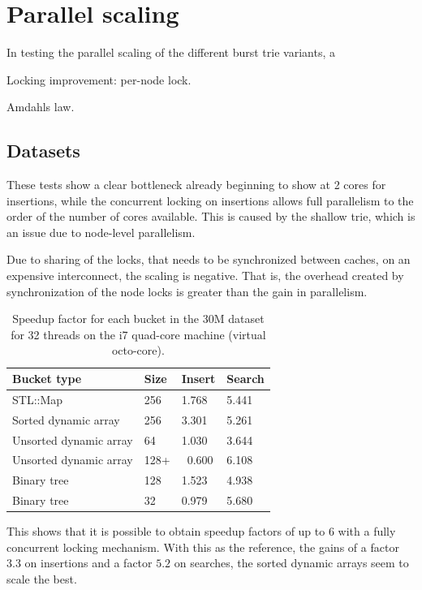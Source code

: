 \section{Parallel scaling}
In testing the parallel scaling of the different burst trie variants,
a  

Locking improvement: per-node lock.

Amdahls law.


\subsection{Datasets}


These tests show a clear bottleneck already beginning to show at 2 cores for
insertions, while the concurrent locking on insertions allows full parallelism
to the order of the number of cores available. This is caused by the shallow
trie, which is an issue due to node-level parallelism.

Due to sharing of the locks, that needs to be synchronized between caches, on
an expensive interconnect, the scaling is negative. That is, the overhead
created by synchronization of the node locks is greater than the gain in
parallelism.

\begin{table}[h]
    \centering
    \begin{tabular}[here]{ l l l l }
    \hline
        Bucket type            & Size & Insert & Search\\\hline
        STL::Map               & 256  & 1.768  & 5.441\\
        Sorted dynamic array   & 256  & 3.301  & 5.261\\
        Unsorted dynamic array & 64   & 1.030  & 3.644\\
        Unsorted dynamic array & 128+ & ~0.600 & 6.108\\
        Binary tree            & 128  & 1.523  & 4.938\\
        Binary tree            & 32   & 0.979  & 5.680\\
    \hline
    \end{tabular}
    \caption{Speedup factor for each bucket in the 30M dataset for 32 threads on the i7
quad-core machine (virtual octo-core).}
    \label{tab:speedups_30m_i7}
\end{table}

This shows that it is possible to obtain speedup factors of up to 6 with a
fully concurrent locking mechanism. With this as the reference, the gains
of a factor $3.3$ on insertions and a factor $5.2$ on searches, the sorted
dynamic arrays seem to scale the best.

